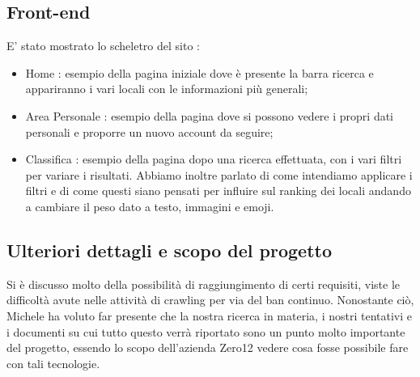 \subsection{Front-end}
E' stato mostrato lo scheletro del sito : 
\begin{itemize}
	\item Home : esempio della pagina iniziale dove è presente la barra ricerca e appariranno i vari locali con le informazioni più generali;
	\item Area Personale : esempio della pagina dove si possono vedere i propri dati personali e proporre un nuovo account da seguire;
	\item Classifica : esempio della pagina dopo una ricerca effettuata, con i vari filtri per variare i risultati.
	Abbiamo inoltre parlato di come intendiamo applicare i filtri e di come questi siano pensati per influire sul ranking dei locali andando a cambiare il peso dato a testo, immagini e emoji.
\end{itemize}


\subsection{Ulteriori dettagli e scopo del progetto}
Si è discusso molto della possibilità di raggiungimento di certi requisiti, viste le difficoltà avute nelle attività di crawling per via del ban continuo. Nonostante ciò,
Michele ha voluto far presente che la nostra ricerca in materia, i nostri tentativi e i documenti su cui tutto questo verrà riportato sono un punto molto importante del progetto, essendo lo scopo 
dell'azienda Zero12 vedere cosa fosse possibile fare con tali tecnologie.




\pagebreak
